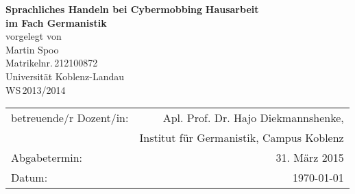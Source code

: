 \begin{titlepage}
	\begin{center}
		\quad
		\vfill
		\Huge{
			 \textbf{Sprachliches Handeln bei Cybermobbing}
		}
		\vspace{5mm}
		\vfill
		\large{
			{\bf Hausarbeit\\
			im Fach Germanistik}
		}
		\\
		\vspace{0.5cm}
		\large{
			{vorgelegt von\\
			Martin Spoo\\
			Matrikelnr.\,212100872}
		}
		\vspace{1cm}
		\\
		\Large{
			{Universität Koblenz-Landau}\\
			{WS\,2013/2014}
		}
		\vspace{1cm}
		\begin{table}[b]
			\begin{center}
				\begin{tabular}{lr}
					betreuende/r Dozent/in: & Apl. Prof. Dr. Hajo Diekmannshenke, \\
								&	Institut für Germanistik, Campus Koblenz \\
					\vspace{0.5cm}
					Abgabetermin: & 31. März 2015 \\
					Datum: & \today
				\end{tabular}
			\end{center}
		\end{table}
	\end{center}
\end{titlepage}
\renewcommand{\baselinestretch}{1.1}
\restoregeometry

